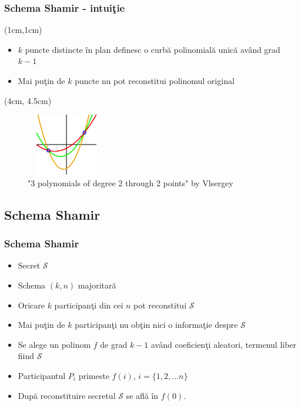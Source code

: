 \documentclass{beamer}
\theoremstyle{definition}
\begin{document}
\begin{frame}
    \frametitle{Schema Shamir - intui\c{t}ie}
    \begin{textblock*}{12cm}(1cm,1cm)
        \begin{itemize}
            \item $k$ puncte distincte \^{i}n plan definesc o curb\u{a} polinomial\u{a} unic\u{a} av\^{a}nd grad $k - 1$
            \pause
            \item Mai pu\c{t}in de $k$ puncte nu pot reconstitui polinomul original
        \end{itemize}
        \pause
    \end{textblock*}
     {
        \begin{textblock*}{4cm}(4cm, 4.5cm)
        \begin{figure}
            \includegraphics[width=3.5cm,height=2.7cm,keepaspectratio]{img/shamir/shamir.png}
            \caption{"3 polynomials of degree 2 through 2 points" by Vlsergey}
        \end{figure}
        \end{textblock*}
     }
\end{frame}

\subsection{Schema Shamir}
\begin{frame}
    \frametitle{Schema Shamir}
    \begin{itemize}
        \item Secret $\mathcal{S}$
        \pause
        \item Schema $(k,n)$ majoritar\u{a}
        \pause
        \item Oricare $k$ participan\c{t}i din cei $n$ pot reconstitui $\mathcal{S}$
        \pause
        \item Mai pu\c{t}in de $k$ participan\c{t}i nu ob\c{t}in nici o informa\c{t}ie despre $\mathcal{S}$
        \pause
        \item Se alege un polinom $f$ de grad $k - 1$ av\^{a}nd coeficien\c{t}i aleatori, termenul liber fiind $\mathcal{S}$
        \pause
        \item Participantul $P_i$ primeste $f(i)$, $i = \{1, 2, ...n\}$
        \pause
        \item Dup\u{a} reconstituire secretul $\mathcal{S}$ se afl\u{a} \^{i}n $f(0)$.
    \end{itemize}
\end{frame}
\end{document}
